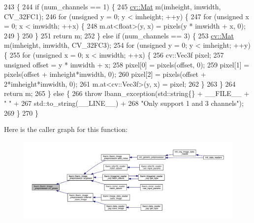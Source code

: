 \begin{DoxyCode}
243                            \{
244   \textcolor{keywordflow}{if} (num\_channels == 1) \{
245     \hyperlink{base_8hpp_a68f11fdc31b62516cb310831bbe54d73}{cv::Mat} m(imheight, imwidth, CV\_32FC1);
246     \textcolor{keywordflow}{for} (\textcolor{keywordtype}{unsigned} y = 0; y < imheight; ++y) \{
247       \textcolor{keywordflow}{for} (\textcolor{keywordtype}{unsigned} x = 0; x < imwidth; ++x) \{
248         m.at<\textcolor{keywordtype}{float}>(y, x) = pixels(y * imwidth + x, 0);
249       \}
250     \}
251     \textcolor{keywordflow}{return} m;
252   \} \textcolor{keywordflow}{else} \textcolor{keywordflow}{if} (num\_channels == 3) \{
253     \hyperlink{base_8hpp_a68f11fdc31b62516cb310831bbe54d73}{cv::Mat} m(imheight, imwidth, CV\_32FC3);
254     \textcolor{keywordflow}{for} (\textcolor{keywordtype}{unsigned} y = 0; y < imheight; ++y) \{
255       \textcolor{keywordflow}{for} (\textcolor{keywordtype}{unsigned} x = 0; x < imwidth; ++x) \{
256         cv::Vec3f pixel;
257         \textcolor{keywordtype}{unsigned} offset = y * imwidth + x;
258         pixel[0] = pixels(offset, 0);
259         pixel[1] = pixels(offset + imheight*imwidth, 0);
260         pixel[2] = pixels(offset + 2*imheight*imwidth, 0);
261         m.at<cv::Vec3f>(y, x) = pixel;
262       \}
263     \}
264     \textcolor{keywordflow}{return} m;
265   \} \textcolor{keywordflow}{else} \{
266     \textcolor{keywordflow}{throw} lbann\_exception(std::string\{\} + \_\_FILE\_\_ + \textcolor{stringliteral}{" "} +
267                           std::to\_string(\_\_LINE\_\_) +
268                           \textcolor{stringliteral}{"Only support 1 and 3 channels"});
269   \}
270 \}
\end{DoxyCode}
Here is the caller graph for this function\+:\nopagebreak
\begin{figure}[H]
\begin{center}
\leavevmode
\includegraphics[width=350pt]{classlbann_1_1lbann__image__preprocessor_a7dc609e33febdc7fc29bdc9270594bea_icgraph}
\end{center}
\end{figure}
\mbox{\label{classlbann_1_1lbann__image__preprocessor_a871cb543ee6c132a76e16045a1a2a9f3}} 
